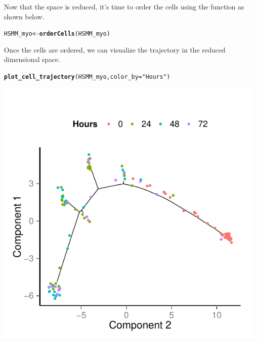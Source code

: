 \documentclass[10pt,oneside]{article}\usepackage[]{graphicx}\usepackage[]{color}
\makeatletter
\def\maxwidth{ %
  \ifdim\Gin@nat@width>\linewidth
    \linewidth
  \else
    \Gin@nat@width
  \fi
}
\newcommand{\hlstr}[1]{\textcolor[rgb]{0.192,0.494,0.8}{#1}}%
\newcommand{\hlstd}[1]{\textcolor[rgb]{0.345,0.345,0.345}{#1}}%
\newcommand{\hlkwb}[1]{\textcolor[rgb]{0.69,0.353,0.396}{#1}}%
\newcommand{\hlkwc}[1]{\textcolor[rgb]{0.333,0.667,0.333}{#1}}%
\newcommand{\hlkwd}[1]{\textcolor[rgb]{0.737,0.353,0.396}{\textbf{#1}}}%
\newenvironment{kframe}{%
 \def\at@end@of@kframe{}%
 \ifinner\ifhmode%
  \def\at@end@of@kframe{\end{minipage}}%
  \begin{minipage}{\columnwidth}%
 \fi\fi%
 \def\FrameCommand##1{\hskip\@totalleftmargin \hskip-\fboxsep
 \colorbox{shadecolor}{##1}\hskip-\fboxsep
     \hskip-\linewidth \hskip-\@totalleftmargin \hskip\columnwidth}%
 \MakeFramed {\advance\hsize-\width
   \@totalleftmargin\z@ \linewidth\hsize
   \@setminipage}}%
 {\par\unskip\endMakeFramed%
 \at@end@of@kframe}
\newenvironment{knitrout}{}{} %
\makeatother
\begin{document}
Now that the space is reduced, it's time to order the cells using the  function as shown below. 

\begin{knitrout}
\color{fgcolor}\begin{kframe}
\begin{alltt}
\hlstd{HSMM_myo} \hlkwb{<-} \hlkwd{orderCells}\hlstd{(HSMM_myo)}
\end{alltt}
\end{kframe}
\end{knitrout}

Once the cells are ordered, we can visualize the trajectory in the reduced 
dimensional space.
 
\begin{knitrout}
\color{fgcolor}\begin{kframe}
\begin{alltt}
\hlkwd{plot_cell_trajectory}\hlstd{(HSMM_myo,} \hlkwc{color_by}\hlstd{=}\hlstr{"Hours"}\hlstd{)}
\end{alltt}
\end{kframe}

{\centering \includegraphics[width=\maxwidth]{figure/plot_ordering_mst-1} 

}



\end{knitrout}
 
\end{document}

